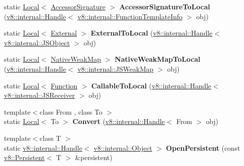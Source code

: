 \begin{DoxyCompactItemize}
\item 
static \hyperlink{classv8_1_1_local}{Local}$<$ \hyperlink{classv8_1_1_accessor_signature}{Accessor\+Signature} $>$ {\bfseries Accessor\+Signature\+To\+Local} (\hyperlink{classv8_1_1internal_1_1_handle}{v8\+::internal\+::\+Handle}$<$ \hyperlink{classv8_1_1internal_1_1_function_template_info}{v8\+::internal\+::\+Function\+Template\+Info} $>$ obj)\hypertarget{classv8_1_1_utils_a7778219dad0e548e442cbd5d98f79f4a}{}\label{classv8_1_1_utils_a7778219dad0e548e442cbd5d98f79f4a}

\item 
static \hyperlink{classv8_1_1_local}{Local}$<$ \hyperlink{classv8_1_1_external}{External} $>$ {\bfseries External\+To\+Local} (\hyperlink{classv8_1_1internal_1_1_handle}{v8\+::internal\+::\+Handle}$<$ \hyperlink{classv8_1_1internal_1_1_j_s_object}{v8\+::internal\+::\+J\+S\+Object} $>$ obj)\hypertarget{classv8_1_1_utils_aa043b78045a591d4a6d99b89b070bc28}{}\label{classv8_1_1_utils_aa043b78045a591d4a6d99b89b070bc28}

\item 
static \hyperlink{classv8_1_1_local}{Local}$<$ \hyperlink{classv8_1_1_native_weak_map}{Native\+Weak\+Map} $>$ {\bfseries Native\+Weak\+Map\+To\+Local} (\hyperlink{classv8_1_1internal_1_1_handle}{v8\+::internal\+::\+Handle}$<$ \hyperlink{classv8_1_1internal_1_1_j_s_weak_map}{v8\+::internal\+::\+J\+S\+Weak\+Map} $>$ obj)\hypertarget{classv8_1_1_utils_a1618fa9256ceecf655dcc3c00db88040}{}\label{classv8_1_1_utils_a1618fa9256ceecf655dcc3c00db88040}

\item 
static \hyperlink{classv8_1_1_local}{Local}$<$ \hyperlink{classv8_1_1_function}{Function} $>$ {\bfseries Callable\+To\+Local} (\hyperlink{classv8_1_1internal_1_1_handle}{v8\+::internal\+::\+Handle}$<$ \hyperlink{classv8_1_1internal_1_1_j_s_receiver}{v8\+::internal\+::\+J\+S\+Receiver} $>$ obj)\hypertarget{classv8_1_1_utils_a41685e0a85f806885ba2438046d9f0cf}{}\label{classv8_1_1_utils_a41685e0a85f806885ba2438046d9f0cf}

\item 
{\footnotesize template$<$class From , class To $>$ }\\static \hyperlink{classv8_1_1_local}{Local}$<$ To $>$ {\bfseries Convert} (\hyperlink{classv8_1_1internal_1_1_handle}{v8\+::internal\+::\+Handle}$<$ From $>$ obj)\hypertarget{classv8_1_1_utils_a9c21e61f893500ba01a11df38161f4c7}{}\label{classv8_1_1_utils_a9c21e61f893500ba01a11df38161f4c7}

\item 
{\footnotesize template$<$class T $>$ }\\static \hyperlink{classv8_1_1internal_1_1_handle}{v8\+::internal\+::\+Handle}$<$ \hyperlink{classv8_1_1internal_1_1_object}{v8\+::internal\+::\+Object} $>$ {\bfseries Open\+Persistent} (const \hyperlink{classv8_1_1_persistent}{v8\+::\+Persistent}$<$ T $>$ \&persistent)\hypertarget{classv8_1_1_utils_a9ab1c52f245ffcabe1335485298ab29c}{}\label{classv8_1_1_utils_a9ab1c52f245ffcabe1335485298ab29c}


\end{DoxyCompactItemize}
